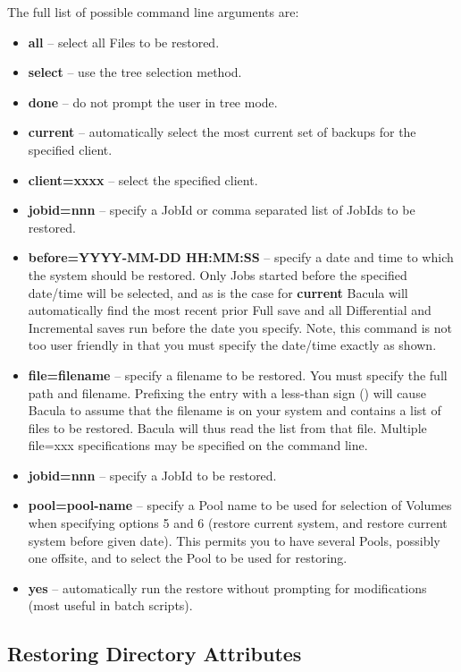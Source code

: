 The full list of possible command line arguments are: 

\begin{itemize}
\item {\bf all} -- select all Files to be restored.  
\item {\bf select} -- use the tree selection method.  
\item {\bf done} -- do not prompt the user in tree mode.  
\item {\bf current} -- automatically select the most current set of  backups
   for the specified client.  
\item {\bf client=xxxx} -- select the specified client.  
\item {\bf jobid=nnn} -- specify a JobId or comma separated list of  JobIds to
   be restored.  
\item {\bf before=YYYY-MM-DD HH:MM:SS} -- specify a date and time to  which
   the system should be restored. Only Jobs started before  the specified
   date/time will be selected, and as is the case  for {\bf current} Bacula will
automatically find the most  recent prior Full save and all Differential and
Incremental  saves run before the date you specify. Note, this command is  not
too user friendly in that you must specify the date/time  exactly as shown. 
\item {\bf file=filename} -- specify a filename to be restored. You  must
   specify the full path and filename. Prefixing the entry  with a less-than sign
   (\lt{}) will cause Bacula to assume that the  filename is on your system and
contains a list of files to be  restored. Bacula will thus read the list from
that file. Multiple  file=xxx specifications may be specified on the command
line. 
\item {\bf jobid=nnn} -- specify a JobId to be restored. 
\item {\bf pool=pool-name} -- specify a Pool name to be used for selection  of
   Volumes when specifying options 5 and 6 (restore current system,  and restore
   current system before given date). This permits you to  have several Pools,
possibly one offsite, and to select the Pool to  be used for restoring.  
\item {\bf yes} -- automatically run the restore without prompting  for
   modifications (most useful in batch scripts). 
   \end{itemize}

\subsection*{Restoring Directory Attributes}

